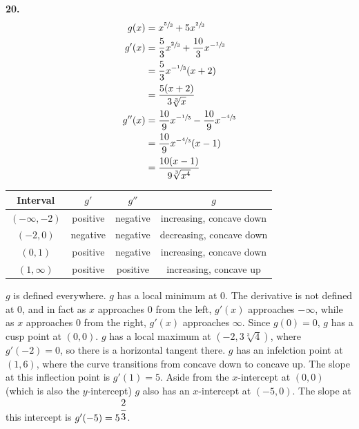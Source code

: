 \documentclass[10pt,oneside,]{book}
\theoremstyle{plain}
\theoremstyle{definition}
\numberwithin{equation}{section}
\newcommand{\fe}[2]{#1\mathopen{}\left(#2\right)\mathclose{}}
\newcommand{\ointerval}[2]{\left(#1,#2\right)}
\newcommand{\point}[2]{\left(#1,#2\right)}
\newcommand{\fd}[1]{#1'}
\newcommand{\sd}[1]{#1''}
\begin{document}
\par\smallskip
\noindent\textbf{20.}\quad{}\begin{align*}
\fe{g}{x}&=x^{\sfrac{5}{3}}+5x^{\sfrac{2}{3}}\\
\fe{\fd{g}}{x}&=\frac{5}{3}x^{\sfrac{2}{3}}+\frac{10}{3}x^{-\sfrac{1}{3}}\\
&=\frac{5}{3}x^{-\sfrac{1}{3}}(x+2)\\
&=\frac{5(x+2)}{3\sqrt[3]{x}}\\
\fe{\sd{g}}{x}&=\frac{10}{9}x^{-\sfrac{1}{3}}-\frac{10}{9}x^{-\sfrac{4}{3}}\\
&=\frac{10}{9}x^{-\sfrac{4}{3}}(x-1)\\
&=\frac{10(x-1)}{9\sqrt[3]{x^4}}
\end{align*}%
\begin{tabular}{cccc}
\toprule
Interval&\(\fd{g}\)&\(\sd{g}\)&\(g\)\\
\midrule
\(\ointerval{-\infty}{-2}\)&positive&negative&increasing, concave down\\
\midrule
\(\ointerval{-2}{0}\)&negative&negative&decreasing, concave down\\
\midrule
\(\ointerval{0}{1}\)&positive&negative&increasing, concave down\\
\midrule
\(\ointerval{1}{\infty}\)&positive&positive&increasing, concave up\\
\midrule
\end{tabular}
\par
\(g\) is defined everywhere. \(g\) has a local minimum at \(0\). The derivative is not defined at \(0\), and in fact as \(x\) approaches \(0\) from the left, \(\fe{\fd{g}}{x}\) approaches \(-\infty\), while as \(x\) approaches \(0\) from the right, \(\fe{\fd{g}}{x}\) approaches \(\infty\). Since \(\fe{g}{0}=0\), \(g\) has a cusp point at \(\point{0}{0}\). \(g\) has a local maximum at \(\point{-2}{3\sqrt[3]{4}}\), where \(\fe{\fd{g}}{-2}=0\), so there is a horizontal tangent there. \(g\) has an infelction point at \(\point{1}{6}\), where the curve transitions from concave down to concave up. The slope at this inflection point is \(\fe{\fd{g}}{1}=5\). Aside from the \(x\)-intercept at \(\point{0}{0}\) (which is also the \(y\)-intercept) \(g\) also has an \(x\)-intercept at \(\point{-5}{0}\). The slope at this intercept is \(\fe{\fd{g}}{-5}=5^{\cfrac{2}{3}}\).%
{
}
\end{document}
